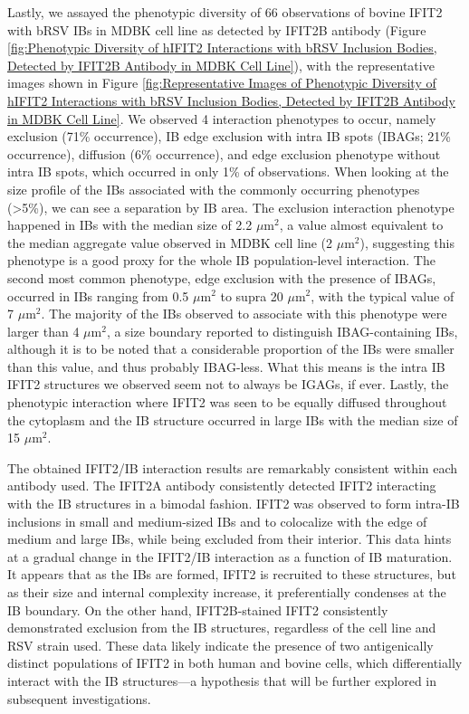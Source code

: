 Lastly, we assayed the phenotypic diversity of 66 observations of bovine IFIT2 with bRSV IBs in MDBK cell line as detected by IFIT2B antibody (Figure \ref{fig:Phenotypic Diversity of hIFIT2 Interactions with bRSV Inclusion Bodies, Detected by IFIT2B Antibody in MDBK Cell Line}), with the representative images shown in Figure \ref{fig:Representative Images of Phenotypic Diversity of hIFIT2 Interactions with bRSV Inclusion Bodies, Detected by IFIT2B Antibody in MDBK Cell Line}. We observed 4 interaction phenotypes to occur, namely exclusion (71\% occurrence), IB edge exclusion with intra IB spots (IBAGs; 21\% occurrence), diffusion (6\% occurrence), and edge exclusion phenotype without intra IB spots, which occurred in only 1\% of observations. When looking at the size profile of the IBs associated with the commonly occurring phenotypes (>5\%), we can see a separation by IB area. The exclusion interaction phenotype happened in IBs with the median size of 2.2 \(\mu \mbox{m}^2\), a value almost equivalent to the median aggregate value observed in MDBK cell line (2 \(\mu \mbox{m}^2\)), suggesting this phenotype is a good proxy for the whole IB population-level interaction. The second most common phenotype, edge exclusion with the presence of IBAGs, occurred in IBs ranging from 0.5 \(\mu \mbox{m}^2\) to supra 20 \(\mu \mbox{m}^2\), with the typical value of 7 \(\mu \mbox{m}^2\). The majority of the IBs observed to associate with this phenotype were larger than 4 \(\mu \mbox{m}^2\), a size boundary reported to distinguish IBAG-containing IBs, although it is to be noted that a considerable proportion of the IBs were smaller than this value, and thus probably IBAG-less. What this means is the intra IB IFIT2 structures we observed seem not to always be IGAGs, if ever. Lastly, the phenotypic interaction where IFIT2 was seen to be equally diffused throughout the cytoplasm and the IB structure occurred in large IBs with the median size of 15 \(\mu \mbox{m}^2\).

The obtained IFIT2/IB interaction results are remarkably consistent within each antibody used. The IFIT2A antibody consistently detected IFIT2 interacting with the IB structures in a bimodal fashion. IFIT2 was observed to form intra-IB inclusions in small and medium-sized IBs and to colocalize with the edge of medium and large IBs, while being excluded from their interior. This data hints at a gradual change in the IFIT2/IB interaction as a function of IB maturation. It appears that as the IBs are formed, IFIT2 is recruited to these structures, but as their size and internal complexity increase, it preferentially condenses at the IB boundary. On the other hand, IFIT2B-stained IFIT2 consistently demonstrated exclusion from the IB structures, regardless of the cell line and RSV strain used. These data likely indicate the presence of two antigenically distinct populations of IFIT2 in both human and bovine cells, which differentially interact with the IB structures—a hypothesis that will be further explored in subsequent investigations.

